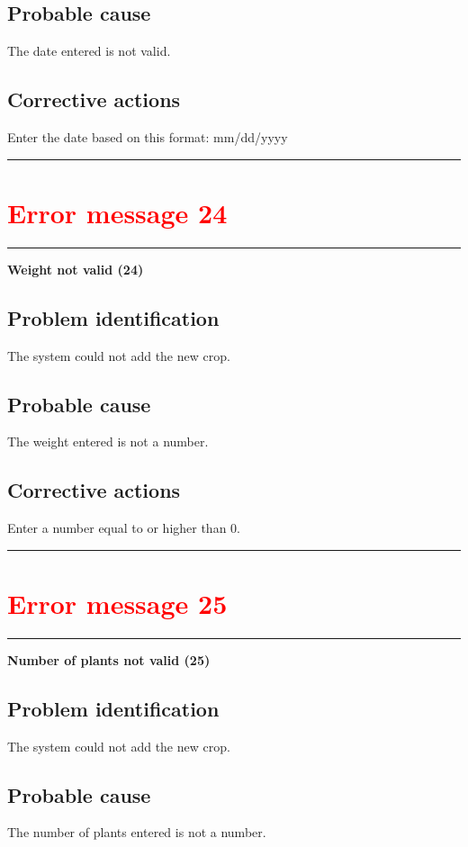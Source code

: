 \subsection{Probable cause}
The date entered is not valid.

\subsection{Corrective actions}
Enter the date based on this format: mm/dd/yyyy
\vspace{0.5cm}
\hrule
\hfill




\section{\textbf{\textcolor{red}{Error message 24}}}
\hrule
\vspace{0.5cm}
\textbf{Weight not valid (24)}
\subsection{Problem identification}
The system could not add the new crop.

\subsection{Probable cause}
The weight entered is not a number.

\subsection{Corrective actions}
Enter a number equal to or higher than 0.
\vspace{0.5cm}
\hrule
\hfill




\section{\textbf{\textcolor{red}{Error message 25}}}
\hrule
\vspace{0.5cm}
\textbf{Number of plants not valid (25)}
\subsection{Problem identification}
The system could not add the new crop.

\subsection{Probable cause}
The number of plants entered is not a number.

